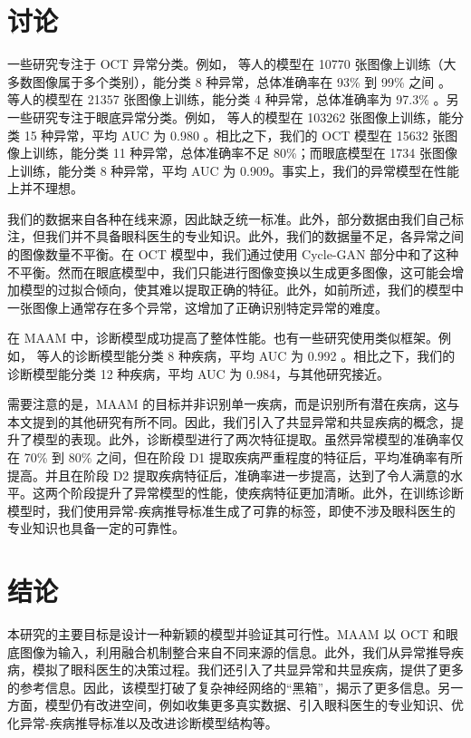 \documentclass{article}
\begin{document}
	\begin{multicols}{2}
	\section{讨论}
	
	一些研究专注于 OCT 异常分类。例如，\citeauthor{leandro2023oct} 等人的模型在 10770 张图像上训练（大多数图像属于多个类别），能分类 8 种异常，总体准确率在 93\% 到 99\% 之间 \autocite{leandro2023oct}。\citeauthor{li2019deep} 等人的模型在 21357 张图像上训练，能分类 4 种异常，总体准确率为 97.3\% \autocite{li2019deep}。另一些研究专注于眼底异常分类。例如，\citeauthor{Son2023} 等人的模型在 103262 张图像上训练，能分类 15 种异常，平均 AUC 为 0.980 \autocite{Son2023}。相比之下，我们的 OCT 模型在 15632 张图像上训练，能分类 11 种异常，总体准确率不足 80\%；而眼底模型在 1734 张图像上训练，能分类 8 种异常，平均 AUC 为 0.909。事实上，我们的异常模型在性能上并不理想。
	
	我们的数据来自各种在线来源，因此缺乏统一标准。此外，部分数据由我们自己标注，但我们并不具备眼科医生的专业知识。此外，我们的数据量不足，各异常之间的图像数量不平衡。在 OCT 模型中，我们通过使用 Cycle-GAN 部分中和了这种不平衡。然而在眼底模型中，我们只能进行图像变换以生成更多图像，这可能会增加模型的过拟合倾向，使其难以提取正确的特征。此外，如前所述，我们的模型中一张图像上通常存在多个异常，这增加了正确识别特定异常的难度。
	
	\vspace{0.3cm}
	
	在 MAAM 中，诊断模型成功提高了整体性能。也有一些研究使用类似框架。例如，\citeauthor{Son2023} 等人的诊断模型能分类 8 种疾病，平均 AUC 为 0.992 \autocite{Son2023}。相比之下，我们的诊断模型能分类 12 种疾病，平均 AUC 为 0.984，与其他研究接近。
	
	需要注意的是，MAAM 的目标并非识别单一疾病，而是识别所有潜在疾病，这与本文提到的其他研究有所不同。因此，我们引入了共显异常和共显疾病的概念，提升了模型的表现。此外，诊断模型进行了两次特征提取。虽然异常模型的准确率仅在 70\% 到 80\% 之间，但在阶段 D1 提取疾病严重程度的特征后，平均准确率有所提高。并且在阶段 D2 提取疾病特征后，准确率进一步提高，达到了令人满意的水平。这两个阶段提升了异常模型的性能，使疾病特征更加清晰。此外，在训练诊断模型时，我们使用异常-疾病推导标准生成了可靠的标签，即使不涉及眼科医生的专业知识也具备一定的可靠性。
	
	\section{结论}
		
	本研究的主要目标是设计一种新颖的模型并验证其可行性。MAAM 以 OCT 和眼底图像为输入，利用融合机制整合来自不同来源的信息。此外，我们从异常推导疾病，模拟了眼科医生的决策过程。我们还引入了共显异常和共显疾病，提供了更多的参考信息。因此，该模型打破了复杂神经网络的“黑箱”，揭示了更多信息。另一方面，模型仍有改进空间，例如收集更多真实数据、引入眼科医生的专业知识、优化异常-疾病推导标准以及改进诊断模型结构等。
	
	\end{multicols}
	
\end{document}

